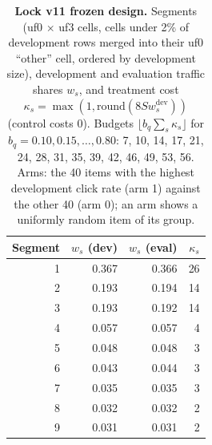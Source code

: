 \begin{table}[H]
\caption{\textbf{Lock v11 frozen design.} Segments (uf0 $\times$ uf3 cells, cells under 2\% of development rows merged into their uf0 ``other'' cell, ordered by development size), development and evaluation traffic shares $w_s$, and treatment cost $\kappa_s = \max(1, \mathrm{round}(8 S w_s^{\text{dev}}))$ (control costs 0). Budgets $\lfloor b_q \sum_s \kappa_s \rfloor$ for $b_q = 0.10, 0.15, \dots, 0.80$: 7, 10, 14, 17, 21, 24, 28, 31, 35, 39, 42, 46, 49, 53, 56. Arms: the 40 items with the highest development click rate (arm 1) against the other 40 (arm 0); an arm shows a uniformly random item of its group.}
\label{tab:v11design}
\footnotesize
\setlength{\tabcolsep}{4pt}
\begin{tabular}{@{}rrrr@{}}
\toprule
Segment & $w_s$ (dev) & $w_s$ (eval) & $\kappa_s$ \\
\midrule
1 & 0.367 & 0.366 & 26 \\
2 & 0.193 & 0.194 & 14 \\
3 & 0.193 & 0.192 & 14 \\
4 & 0.057 & 0.057 & 4 \\
5 & 0.048 & 0.048 & 3 \\
6 & 0.043 & 0.044 & 3 \\
7 & 0.035 & 0.035 & 3 \\
8 & 0.032 & 0.032 & 2 \\
9 & 0.031 & 0.031 & 2 \\
\bottomrule
\end{tabular}
\end{table}
